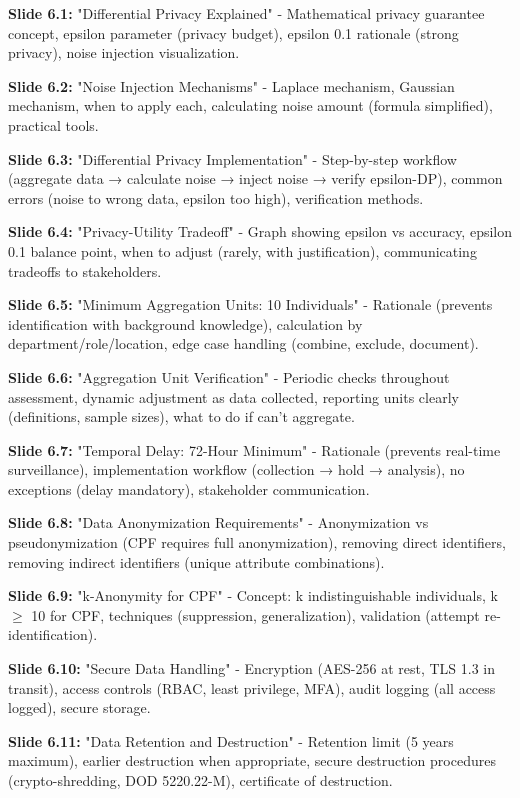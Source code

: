 \documentclass[11pt,a4paper]{article}
\begin{document}
\textbf{Slide 6.1:} "Differential Privacy Explained" - Mathematical privacy guarantee concept, epsilon parameter (privacy budget), epsilon 0.1 rationale (strong privacy), noise injection visualization.

\textbf{Slide 6.2:} "Noise Injection Mechanisms" - Laplace mechanism, Gaussian mechanism, when to apply each, calculating noise amount (formula simplified), practical tools.

\textbf{Slide 6.3:} "Differential Privacy Implementation" - Step-by-step workflow (aggregate data → calculate noise → inject noise → verify epsilon-DP), common errors (noise to wrong data, epsilon too high), verification methods.

\textbf{Slide 6.4:} "Privacy-Utility Tradeoff" - Graph showing epsilon vs accuracy, epsilon 0.1 balance point, when to adjust (rarely, with justification), communicating tradeoffs to stakeholders.

\textbf{Slide 6.5:} "Minimum Aggregation Units: 10 Individuals" - Rationale (prevents identification with background knowledge), calculation by department/role/location, edge case handling (combine, exclude, document).

\textbf{Slide 6.6:} "Aggregation Unit Verification" - Periodic checks throughout assessment, dynamic adjustment as data collected, reporting units clearly (definitions, sample sizes), what to do if can't aggregate.

\textbf{Slide 6.7:} "Temporal Delay: 72-Hour Minimum" - Rationale (prevents real-time surveillance), implementation workflow (collection → hold → analysis), no exceptions (delay mandatory), stakeholder communication.

\textbf{Slide 6.8:} "Data Anonymization Requirements" - Anonymization vs pseudonymization (CPF requires full anonymization), removing direct identifiers, removing indirect identifiers (unique attribute combinations).

\textbf{Slide 6.9:} "k-Anonymity for CPF" - Concept: k indistinguishable individuals, k $\ge$ 10 for CPF, techniques (suppression, generalization), validation (attempt re-identification).

\textbf{Slide 6.10:} "Secure Data Handling" - Encryption (AES-256 at rest, TLS 1.3 in transit), access controls (RBAC, least privilege, MFA), audit logging (all access logged), secure storage.

\textbf{Slide 6.11:} "Data Retention and Destruction" - Retention limit (5 years maximum), earlier destruction when appropriate, secure destruction procedures (crypto-shredding, DOD 5220.22-M), certificate of destruction.
\end{document}
